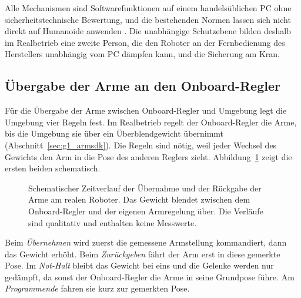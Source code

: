 Alle Mechanismen sind Softwarefunktionen auf einem handelsüblichen PC ohne sicherheitstechnische Bewertung, und die bestehenden Normen lassen sich nicht direkt auf Humanoide anwenden \cite{Prather2025}.
Die unabhängige Schutzebene bilden deshalb im Realbetrieb eine zweite Person, die den Roboter an der Fernbedienung des Herstellers unabhängig vom PC dämpfen kann, und die Sicherung am Kran.

\subsection{Übergabe der Arme an den Onboard-Regler}
\label{sec:armuebergabe}

Für die Übergabe der Arme zwischen Onboard-Regler und Umgebung legt die Umgebung vier Regeln fest.
Im Realbetrieb regelt der Onboard-Regler die Arme, bis die Umgebung sie über ein Überblendgewicht übernimmt (Abschnitt~\ref{sec:g1_armsdk}).
Die Regeln sind nötig, weil jeder Wechsel des Gewichts den Arm in die Pose des anderen Reglers zieht. Abbildung~\ref{fig:armuebergabe} zeigt die ersten beiden schematisch.

\begin{figure}[htbp]
  \centering
  
  \caption[Übernahme und Rückgabe der Arme]{Schematischer Zeitverlauf der Übernahme und der Rückgabe der Arme am realen Roboter. Das Gewicht blendet zwischen dem Onboard-Regler und der eigenen Armregelung über. Die Verläufe sind qualitativ und enthalten keine Messwerte.}
  \label{fig:armuebergabe}
\end{figure}

Beim \emph{Übernehmen} wird zuerst die gemessene Armstellung kommandiert, dann das Gewicht erhöht. Beim \emph{Zurückgeben} fährt der Arm erst in diese gemerkte Pose.
Im \emph{Not-Halt} bleibt das Gewicht bei eins und die Gelenke werden nur gedämpft, da sonst der Onboard-Regler die Arme in seine Grundpose führe. Am \emph{Programmende} fahren sie kurz zur gemerkten Pose.

